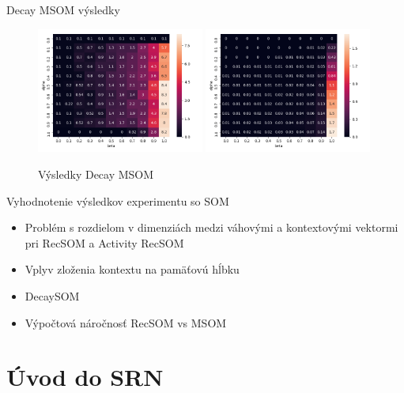 \documentclass[10pt]{beamer}
\begin{document}
\begin{frame}[fragile]{Decay MSOM výsledky}

  \begin{figure}[H]
   \centering
   \includegraphics[width=0.49\textwidth]{assets/dm_memory_span}
   \includegraphics[width=0.49\textwidth]{assets/dm_errors}
   \caption{Výsledky Decay MSOM}
 \end{figure}


\end{frame}

\begin{frame}[fragile]{Vyhodnotenie výsledkov experimentu so SOM}
  \begin{itemize}
    \item Problém s rozdielom v dimenziách medzi váhovými a kontextovými vektormi pri RecSOM a Activity RecSOM
    \item Vplyv zloženia kontextu na pamäťovú hĺbku
    \item DecaySOM
    \item Výpočtová náročnosť RecSOM vs MSOM
  \end{itemize}
\end{frame}

\section{Úvod do SRN}
\end{document}
